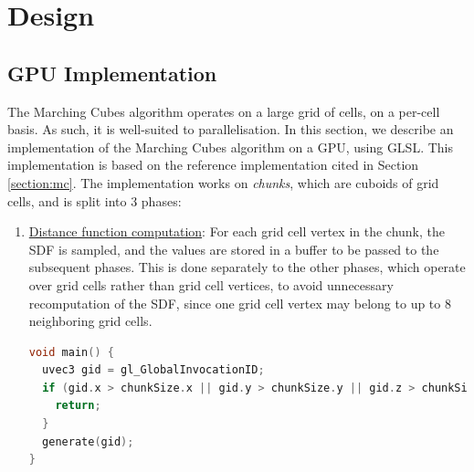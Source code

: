 \documentclass{article}
\begin{document}
\section{Design}
\subsection{GPU Implementation}
\label{section:mc_gpu}
The Marching Cubes algorithm operates on a large grid of cells, on a per-cell basis. As such, it is well-suited to parallelisation. In this section, we describe an implementation of the Marching Cubes algorithm on a GPU, using GLSL. This implementation is based on the reference implementation cited in Section \ref{section:mc}. The implementation works on \textit{chunks}, which are cuboids of grid cells, and is split into 3 phases:
\begin{enumerate}

\item \underline{Distance function computation}: For each grid cell vertex in the chunk, the SDF is sampled, and the values are stored in a buffer to be passed to the subsequent phases. This is done separately to the other phases, which operate over grid cells rather than grid cell vertices, to avoid unnecessary recomputation of the SDF, since one grid cell vertex may belong to up to 8 neighboring grid cells.
\begin{lstlisting}[language=C++,label={mc_generate},caption={GLSL code for generating the SDF at one vertex in a chunk. The function \texttt{generate} may use any SDF, and stores the value in a buffer.}]
void main() {
  uvec3 gid = gl_GlobalInvocationID;
  if (gid.x > chunkSize.x || gid.y > chunkSize.y || gid.z > chunkSize.z) {
    return;
  }
  generate(gid);
}
\end{lstlisting}


\end{enumerate}
\end{document}
